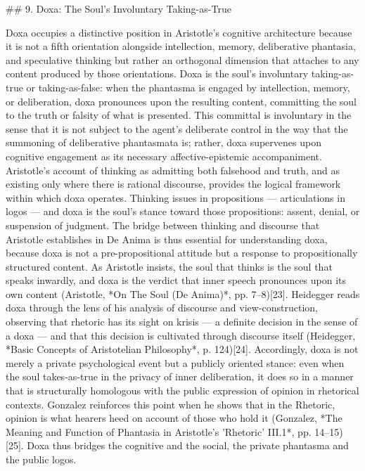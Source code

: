 ## 9. Doxa: The Soul's Involuntary Taking-as-True

Doxa occupies a distinctive position in Aristotle's cognitive architecture because it is not a fifth orientation alongside intellection, memory, deliberative phantasia, and speculative thinking but rather an orthogonal dimension that attaches to any content produced by those orientations. Doxa is the soul's involuntary taking-as-true or taking-as-false: when the phantasma is engaged by intellection, memory, or deliberation, doxa pronounces upon the resulting content, committing the soul to the truth or falsity of what is presented. This committal is involuntary in the sense that it is not subject to the agent's deliberate control in the way that the summoning of deliberative phantasmata is; rather, doxa supervenes upon cognitive engagement as its necessary affective-epistemic accompaniment. Aristotle's account of thinking as admitting both falsehood and truth, and as existing only where there is rational discourse, provides the logical framework within which doxa operates. Thinking issues in propositions — articulations in logos — and doxa is the soul's stance toward those propositions: assent, denial, or suspension of judgment. The bridge between thinking and discourse that Aristotle establishes in De Anima is thus essential for understanding doxa, because doxa is not a pre-propositional attitude but a response to propositionally structured content. As Aristotle insists, the soul that thinks is the soul that speaks inwardly, and doxa is the verdict that inner speech pronounces upon its own content (Aristotle, *On The Soul (De Anima)*, pp. 7–8)[23]. Heidegger reads doxa through the lens of his analysis of discourse and view-construction, observing that rhetoric has its sight on krisis — a definite decision in the sense of a doxa — and that this decision is cultivated through discourse itself (Heidegger, *Basic Concepts of Aristotelian Philosophy*, p. 124)[24]. Accordingly, doxa is not merely a private psychological event but a publicly oriented stance: even when the soul takes-as-true in the privacy of inner deliberation, it does so in a manner that is structurally homologous with the public expression of opinion in rhetorical contexts. Gonzalez reinforces this point when he shows that in the Rhetoric, opinion is what hearers heed on account of those who hold it (Gonzalez, *The Meaning and Function of Phantasia in Aristotle's 'Rhetoric' III.1*, pp. 14–15)[25]. Doxa thus bridges the cognitive and the social, the private phantasma and the public logos. 

